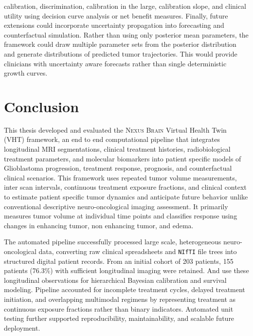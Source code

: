 calibration, discrimination, calibration in the large, calibration slope, and clinical utility using decision curve analysis or net benefit measures. Finally, future extensions could incorporate uncertainty propagation into forecasting and counterfactual simulation. Rather than using only posterior mean parameters, the framework could draw multiple parameter sets from the posterior distribution and generate distributions of predicted tumor trajectories. This would provide clinicians with uncertainty aware forecasts rather than single deterministic growth curves.



\section{Conclusion}

This thesis developed and evaluated the \textsc{Nexus Brain} Virtual Health Twin (VHT) framework, an end to end computational pipeline that integrates longitudinal MRI segmentations, clinical treatment histories, radiobiological treatment parameters, and molecular biomarkers into patient specific models of Glioblastoma progression, treatment response, prognosis, and counterfactual clinical scenarios. This framework uses repeated tumor volume measurements, inter scan intervals, continuous treatment exposure fractions, and clinical context to estimate patient specific tumor dynamics and anticipate future behavior unlike conventional descriptive neuro-oncological imaging assessment. It primarily measures tumor volume at individual time points and classifies response using changes in enhancing tumor, non enhancing tumor, and edema.

The automated pipeline successfully processed large scale, heterogeneous neuro-oncological data, converting raw clinical spreadsheets and \texttt{NIfTI} file trees into structured digital patient records. From an initial cohort of 203 patients, 155 patients (76.3\%) with sufficient longitudinal imaging were retained. And use these longitudinal observations for hierarchical Bayesian calibration and survival modeling. Pipeline accounted for incomplete treatment cycles, delayed treatment initiation, and overlapping multimodal regimens by representing treatment as continuous exposure fractions rather than binary indicators. Automated unit testing further supported reproducibility, maintainability, and scalable future deployment.

